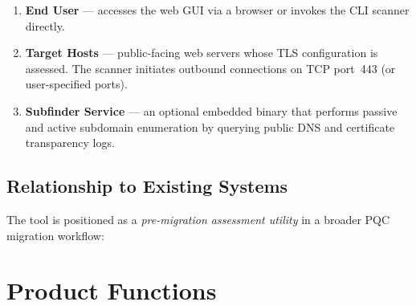 \begin{enumerate}[noitemsep]
  \item \textbf{End User} — accesses the web GUI via a browser or invokes the
        CLI scanner directly.
  \item \textbf{Target Hosts} — public-facing web servers whose TLS configuration
        is assessed. The scanner initiates outbound connections on TCP port~443
        (or user-specified ports).
  \item \textbf{Subfinder Service} — an optional embedded binary that performs
        passive and active subdomain enumeration by querying public DNS and
        certificate transparency logs.
\end{enumerate}

\subsection{Relationship to Existing Systems}

The tool is positioned as a \textit{pre-migration assessment utility} in a broader
PQC migration workflow:

\begin{center}
\end{center}

\section{Product Functions}
\label{sec:product_functions}

